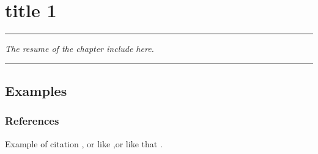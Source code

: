 
\lhead[\fancyplain{}{\leftmark}]%
      {\fancyplain{}{}} %
\chead[\fancyplain{}{}]%
      {\fancyplain{}{}}
\rhead[\fancyplain{}{}]%
      {\fancyplain{}{\rightmark}}%
\lfoot[\fancyplain{}{}]%
      {\fancyplain{}{}}
\cfoot[\fancyplain{}{\thepage}]%
      {\fancyplain{}{\thepage}} %
\rfoot[\fancyplain{}{}]%
     {\fancyplain{}{\scriptsize}}



\chapter{title 1}
\label{ch:1}


\begin{center}
\rule{0.7\linewidth}{.5pt}
\begin{minipage}{0.7\linewidth}
\smallskip

\textit{The resume of the chapter include here.
}

\end{minipage}
\smallskip
\rule{0.7\linewidth}{.5pt}
\end{center}

\minitoc
\newpage


\section{Examples}
\subsection{References}

Example of citation \cite{Collomb2017}, or like  \cite{Collomb2018b},or like that \cite{Collomb2018a,Collomb2017a,Collomb2018}. \\


\FloatBarrier
